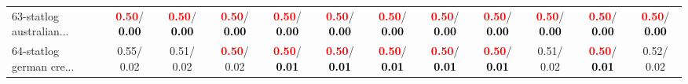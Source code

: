 \begin{table}[h]
\begin{center}
{\begin{tabular}{lc|c|c|c|c|c|c|c|c|c|c}
63-statlog australian... & \textcolor{red}{\textbf{  0.50}}/\textcolor{black}{\textbf{  0.00}} & \textcolor{red}{\textbf{  0.50}}/\textcolor{black}{\textbf{  0.00}} & \textcolor{red}{\textbf{  0.50}}/\textcolor{black}{\textbf{  0.00}} & \textcolor{red}{\textbf{  0.50}}/\textcolor{black}{\textbf{  0.00}} & \textcolor{red}{\textbf{  0.50}}/\textcolor{black}{\textbf{  0.00}} & \textcolor{red}{\textbf{  0.50}}/\textcolor{black}{\textbf{  0.00}} & \textcolor{red}{\textbf{  0.50}}/\textcolor{black}{\textbf{  0.00}} & \textcolor{red}{\textbf{  0.50}}/\textcolor{black}{\textbf{  0.00}} & \textcolor{red}{\textbf{  0.50}}/\textcolor{black}{\textbf{  0.00}} & \textcolor{red}{\textbf{  0.50}}/\textcolor{black}{\textbf{  0.00}} & \textcolor{red}{\textbf{  0.50}}/\textcolor{black}{\textbf{  0.00}} \\
64-statlog german cre... &   0.55/  0.02 &   0.51/  0.02 & \textcolor{red}{\textbf{  0.50}}/  0.02 & \textcolor{red}{\textbf{  0.50}}/\textcolor{black}{\textbf{  0.01}} & \textcolor{red}{\textbf{  0.50}}/\textcolor{black}{\textbf{  0.01}} & \textcolor{red}{\textbf{  0.50}}/\textcolor{black}{\textbf{  0.01}} & \textcolor{red}{\textbf{  0.50}}/\textcolor{black}{\textbf{  0.01}} & \textcolor{red}{\textbf{  0.50}}/\textcolor{black}{\textbf{  0.01}} &   0.51/  0.02 & \textcolor{red}{\textbf{  0.50}}/\textcolor{black}{\textbf{  0.01}} &   0.52/  0.02 \\\end{tabular}}\label{stratsBalAcc1aSVM}
\end{center}
\end{table}
